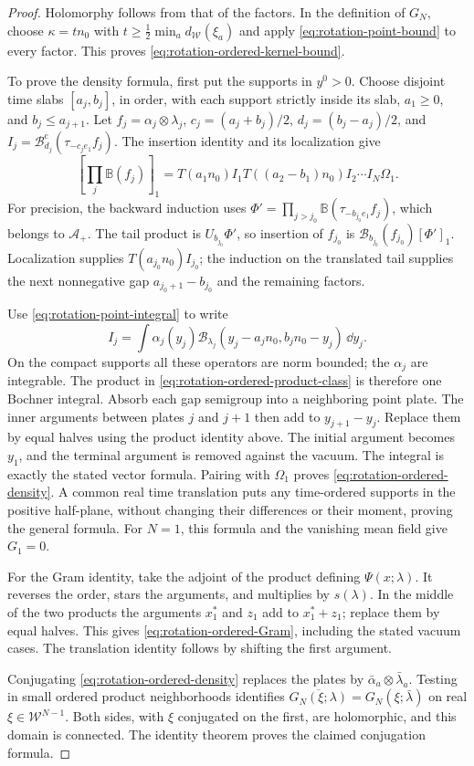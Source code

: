 \begin{proof}
Holomorphy follows from that of the factors. In the definition of
$G_N$, choose $\kappa=tn_0$ with
$t\ge\frac12\min_a d_{\mathcal W}(\xi_a)$ and apply
\eqref{eq:rotation-point-bound} to every factor. This proves
\eqref{eq:rotation-ordered-kernel-bound}.

To prove the density formula, first put the supports in $y^0>0$.
Choose disjoint time slabs $[a_j,b_j]$, in order, with each support
strictly inside its slab, $a_1\ge0$, and $b_j\le a_{j+1}$.
Let $f_j=\alpha_j\otimes\lambda_j$,
$c_j=(a_j+b_j)/2$, $d_j=(b_j-a_j)/2$, and
$I_j=\mathcal B_{d_j}^{\mathrm c}(\tau_{-c_je_1}f_j)$.
The insertion identity and its localization give
\begin{equation}\label{eq:rotation-ordered-product-class}
 \left[\prod_j\mathbb B(f_j)\right]_1
 =T(a_1n_0)I_1T((a_2-b_1)n_0)I_2\cdots I_N\Omega_1.
\end{equation}
For precision, the backward induction uses
$\Phi'=\prod_{j>j_0}\mathbb B(\tau_{-b_{j_0}e_1}f_j)$,
which belongs to $\mathcal A_+$.
The tail product is $U_{b_{j_0}}\Phi'$, so insertion of $f_{j_0}$
is $\mathcal B_{b_{j_0}}(f_{j_0})[\Phi']_1$.
Localization supplies $T(a_{j_0}n_0)I_{j_0}$; the induction
on the translated tail supplies the next nonnegative gap
$a_{j_0+1}-b_{j_0}$ and the remaining factors.

Use \eqref{eq:rotation-point-integral} to write
\[
 I_j=\int\alpha_j(y_j)
       \mathcal B_{\lambda_j}(y_j-a_jn_0,b_jn_0-y_j)\,\dd y_j.
\]
On the compact supports all these operators are norm bounded;
the $\alpha_j$ are integrable. The product in
\eqref{eq:rotation-ordered-product-class} is therefore one Bochner
integral. Absorb each gap semigroup into a neighboring point plate.
The inner arguments between plates $j$ and $j+1$ then add to
$y_{j+1}-y_j$. Replace them by equal halves using the product
identity above. The initial argument becomes $y_1$, and the
terminal argument is removed against the vacuum. The integral is
exactly the stated vector formula. Pairing with $\Omega_1$ proves
\eqref{eq:rotation-ordered-density}.
A common real time translation puts any time-ordered supports in
the positive half-plane, without changing their differences or
their moment, proving the general formula.
For $N=1$, this formula and the vanishing mean field give $G_1=0$.

For the Gram identity, take the adjoint of the product defining
$\Psi(x;\lambda)$. It reverses the order, stars the arguments,
and multiplies by $s(\lambda)$. In the middle of the two products
the arguments $x_1^*$ and $z_1$ add to $x_1^*+z_1$; replace them
by equal halves. This gives
\eqref{eq:rotation-ordered-Gram}, including the stated vacuum cases.
The translation identity follows by shifting the first argument.

Conjugating \eqref{eq:rotation-ordered-density} replaces the plates
by $\bar\alpha_a\otimes\bar\lambda_a$. Testing in small ordered
product neighborhoods identifies
$\overline{G_N(\xi;\lambda)}=G_N(\xi;\bar\lambda)$ on real
$\xi\in\mathcal W^{N-1}$. Both sides, with $\xi$ conjugated on
the first, are holomorphic, and this domain is connected.
The identity theorem proves the claimed conjugation formula.
\end{proof}

